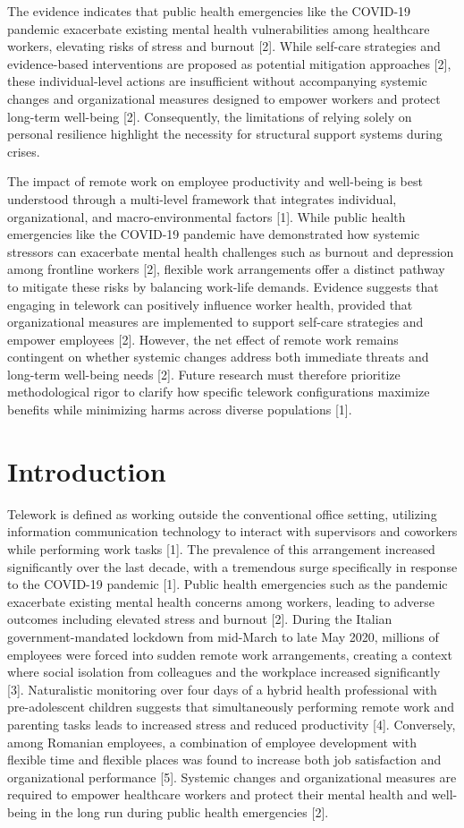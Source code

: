 \documentclass[11pt]{article}
\begin{document}
The evidence indicates that public health emergencies like the COVID-19 pandemic exacerbate existing mental health vulnerabilities among healthcare workers, elevating risks of stress and burnout [2]. While self-care strategies and evidence-based interventions are proposed as potential mitigation approaches [2], these individual-level actions are insufficient without accompanying systemic changes and organizational measures designed to empower workers and protect long-term well-being [2]. Consequently, the limitations of relying solely on personal resilience highlight the necessity for structural support systems during crises.

The impact of remote work on employee productivity and well-being is best understood through a multi-level framework that integrates individual, organizational, and macro-environmental factors [1]. While public health emergencies like the COVID-19 pandemic have demonstrated how systemic stressors can exacerbate mental health challenges such as burnout and depression among frontline workers [2], flexible work arrangements offer a distinct pathway to mitigate these risks by balancing work-life demands. Evidence suggests that engaging in telework can positively influence worker health, provided that organizational measures are implemented to support self-care strategies and empower employees [2]. However, the net effect of remote work remains contingent on whether systemic changes address both immediate threats and long-term well-being needs [2]. Future research must therefore prioritize methodological rigor to clarify how specific telework configurations maximize benefits while minimizing harms across diverse populations [1].

\section{Introduction}
Telework is defined as working outside the conventional office setting, utilizing information communication technology to interact with supervisors and coworkers while performing work tasks [1]. The prevalence of this arrangement increased significantly over the last decade, with a tremendous surge specifically in response to the COVID-19 pandemic [1]. Public health emergencies such as the pandemic exacerbate existing mental health concerns among workers, leading to adverse outcomes including elevated stress and burnout [2]. During the Italian government-mandated lockdown from mid-March to late May 2020, millions of employees were forced into sudden remote work arrangements, creating a context where social isolation from colleagues and the workplace increased significantly [3]. Naturalistic monitoring over four days of a hybrid health professional with pre-adolescent children suggests that simultaneously performing remote work and parenting tasks leads to increased stress and reduced productivity [4]. Conversely, among Romanian employees, a combination of employee development with flexible time and flexible places was found to increase both job satisfaction and organizational performance [5]. Systemic changes and organizational measures are required to empower healthcare workers and protect their mental health and well-being in the long run during public health emergencies [2].
\end{document}
